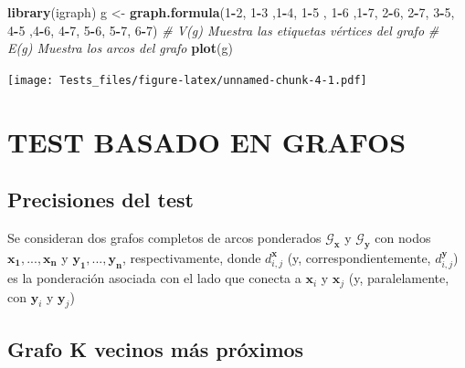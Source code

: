 \documentclass[]{book}
\newenvironment{Shaded}{\begin{snugshade}}{\end{snugshade}}
\newcommand{\KeywordTok}[1]{\textcolor[rgb]{0.13,0.29,0.53}{\textbf{#1}}}
\newcommand{\DecValTok}[1]{\textcolor[rgb]{0.00,0.00,0.81}{#1}}
\newcommand{\StringTok}[1]{\textcolor[rgb]{0.31,0.60,0.02}{#1}}
\newcommand{\CommentTok}[1]{\textcolor[rgb]{0.56,0.35,0.01}{\textit{#1}}}
\newcommand{\OperatorTok}[1]{\textcolor[rgb]{0.81,0.36,0.00}{\textbf{#1}}}
\newcommand{\NormalTok}[1]{#1}
\begin{document}
\begin{Shaded}
\begin{Highlighting}[]
\KeywordTok{library}\NormalTok{(igraph)}
\NormalTok{g <-}\StringTok{ }\KeywordTok{graph.formula}\NormalTok{(}\DecValTok{1}\OperatorTok{-}\DecValTok{2}\NormalTok{, }\DecValTok{1}\OperatorTok{-}\DecValTok{3}\NormalTok{ ,}\DecValTok{1}\OperatorTok{-}\DecValTok{4}\NormalTok{, }\DecValTok{1}\OperatorTok{-}\DecValTok{5}\NormalTok{ , }\DecValTok{1}\OperatorTok{-}\DecValTok{6}\NormalTok{ ,}\DecValTok{1}\OperatorTok{-}\DecValTok{7}\NormalTok{, }\DecValTok{2}\OperatorTok{-}\DecValTok{6}\NormalTok{, }\DecValTok{2}\OperatorTok{-}\DecValTok{7}\NormalTok{, }\DecValTok{3}\OperatorTok{-}\DecValTok{5}\NormalTok{, }\DecValTok{4}\OperatorTok{-}\DecValTok{5}\NormalTok{ ,}\DecValTok{4}\OperatorTok{-}\DecValTok{6}\NormalTok{, }\DecValTok{4}\OperatorTok{-}\DecValTok{7}\NormalTok{, }\DecValTok{5}\OperatorTok{-}\DecValTok{6}\NormalTok{, }\DecValTok{5}\OperatorTok{-}\DecValTok{7}\NormalTok{, }\DecValTok{6}\OperatorTok{-}\DecValTok{7}\NormalTok{)}
\CommentTok{# V(g) Muestra las etiquetas vértices del grafo}
\CommentTok{# E(g) Muestra los arcos del grafo}
\KeywordTok{plot}\NormalTok{(g)}
\end{Highlighting}
\end{Shaded}

\texttt{[image: Tests\_files/figure-latex/unnamed-chunk-4-1.pdf]}

\chapter{TEST BASADO EN GRAFOS}\label{test-basado-en-grafos}

\section{Precisiones del test}\label{precisiones-del-test}

Se consideran dos grafos completos de arcos ponderados
\(\mathcal{G}_{\mathbf{x}}\) y \(\mathcal{G}_{\mathbf{y}}\) con nodos
\(\mathbf{x_1,...,x_n}\) y \(\mathbf{y_1,..., y_n}\), respectivamente,
donde \(d_{i,j}^{\mathbf{x}}\) (y, correspondientemente,
\(d_{i,j}^{\mathbf{y}}\)) es la ponderación asociada con el lado que
conecta a \(\mathbf{x}_i\) y \(\mathbf{x}_j\) (y, paralelamente, con
\(\mathbf{y}_i\) y \(\mathbf{y}_j\)) \citep{friedman1983graph}

\section{Grafo K vecinos más
próximos}\label{grafo-k-vecinos-mas-proximos}
\end{document}
